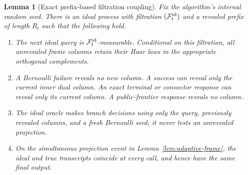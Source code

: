 \documentclass[11pt,a4paper]{article}
\newcommand{\cF}{\mathcal F}
\newtheorem{lemma}[theorem]{Lemma}
\theoremstyle{definition}
\theoremstyle{remark}
\numberwithin{equation}{section}
\begin{document}
\begin{lemma}[Exact prefix-based filtration coupling]
\label{lem:filtration}
Fix the algorithm's internal random seed.  There is an ideal process with
filtration $(\cF_t^{\rm id})$ and a revealed prefix of length $R_t$ such
that the following hold.
\begin{enumerate}
\item The next ideal query is $\cF_t^{\rm id}$-measurable.  Conditional on
this filtration, all unrevealed frame columns retain their Haar laws in
the appropriate orthogonal complements.
\item A Bernoulli failure reveals no new column.  A success can reveal
only the current inner dual column.  An exact terminal or connector
response can reveal only its current column.  A public-frontier response
reveals no column.
\item The ideal oracle makes branch decisions using only the query,
previously revealed columns, and a fresh Bernoulli seed; it never tests
an unrevealed projection.
\item On the simultaneous projection event in
Lemma~\ref{lem:adaptive-frame}, the ideal and true transcripts coincide
at every call, and hence have the same final output.
\end{enumerate}
\end{lemma}
\end{document}
